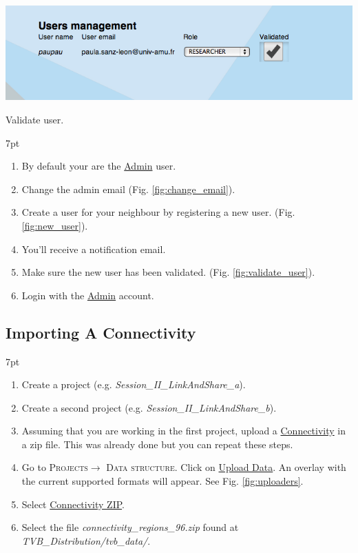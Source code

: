 \documentclass{tufte-handout}
\newenvironment{formal}{%
  \def\FrameCommand{%
    \hspace{1pt}%
    {\color{DarkBlue}\vrule width 2pt}%
    {\color{formalshade}\vrule width 4pt}%
    \colorbox{formalshade}%
  }%
  \MakeFramed{\advance\hsize-\width\FrameRestore}%
  \noindent\hspace{-4.55pt}%
  \begin{adjustwidth}{}{7pt}%
  \vspace{2pt}\vspace{2pt}%
}
{%
  \vspace{2pt}\end{adjustwidth}\endMakeFramed%
}
\begin{document}
\begin{marginfigure}
  \includegraphics[width=\linewidth]{Handout_UI_LinkAndShare_ValidateNewUser}%
  \caption{Validate user.}%
  \label{fig:validate_user}%
\end{marginfigure}

\begin{formal}
\begin{enumerate}
\item By default your are the \underline{Admin} user. 
\item Change the admin email (Fig. \ref{fig:change_email}).
\item Create a user for your neighbour by registering a new user. (Fig. \ref{fig:new_user}). 
\item You'll receive a notification email.
\item Make sure the new user has been validated. (Fig. \ref{fig:validate_user}).
\item Login with the \underline{Admin} account. 
\end{enumerate}
\end{formal}

\subsection{Importing A Connectivity}\label{sec:import_connectivity}

\begin{formal}
\begin{enumerate}
\item Create a project (e.g. \textit{Session\_II\_LinkAndShare\_a}). 
\item Create a second project (e.g. \textit{Session\_II\_LinkAndShare\_b}). 
\item Assuming that you are working in the first project, upload a \underline{Connectivity} in a zip file. This was already done but you can repeat these steps. 
\item Go to \textsc{Projects}$\rightarrow$ \textsc{Data structure}. Click on \underline{Upload Data}. An overlay with the current supported formats will appear. See Fig. \ref{fig:uploaders}. 
\item Select \underline{Connectivity ZIP}. 
\item Select the file \textit{connectivity\_regions\_96.zip} found at \textit{TVB\_Distribution/tvb\_data/}.
\end{enumerate}
\end{formal} 
\end{document}
